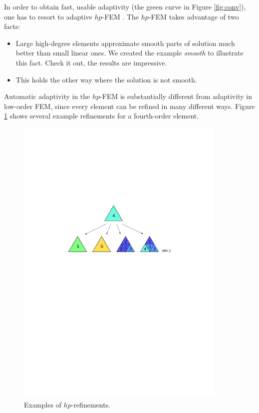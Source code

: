 \documentclass[11pt]{article}
\begin{document}
In order to obtain fast, usable adaptivity (the green curve in Figure \ref{fig:conv}), one
has to resort to adaptive $hp$-FEM \cite{solin1}. The $hp$-FEM takes advantage of two
facts:

\begin{itemize}
\item Large high-degree elements approximate smooth parts of solution much
better than small linear ones. We created the example {\em smooth} to illustrate
this fact. Check it out, the results are impressive.
\item This holds the other way where the solution is not smooth.
\end{itemize}

Automatic adaptivity in the $hp$-FEM is substantially different from adaptivity
in low-order FEM, since every element can be refined in many different ways.
Figure \ref{fig:refinements} shows several example refinements for a fourth-order element.

\begin{figure}[!ht]
  \medskip \centering
  \includegraphics[width=0.9\textwidth]{img/refinements}
  \caption{Examples of $hp$-refinements.}
  \label{fig:refinements}
\end{figure}
\end{document}
